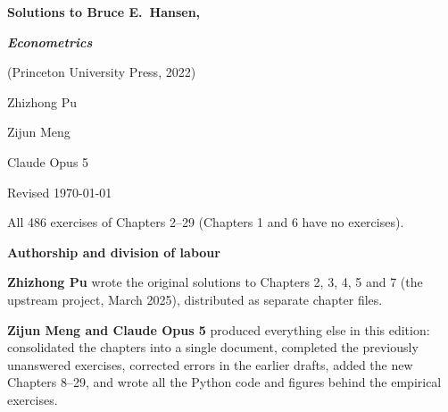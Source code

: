 \documentclass[11pt,letterpaper,reqno]{amsart}
\begin{document}
\begin{titlepage}
\centering
\vspace*{0.22\textheight}
{\LARGE\bfseries Solutions to Bruce E.\ Hansen,\par}
\vspace{1.2ex}
{\LARGE\bfseries\itshape Econometrics\par}
\vspace{1.2ex}
{\large (Princeton University Press, 2022)\par}
\vspace{4em}
{\Large Zhizhong Pu\par}
\vspace{1ex}
{\Large Zijun Meng\par}
\vspace{1ex}
{\Large Claude Opus 5\par}
\vspace{4em}
{\large Revised \today\par}
\vfill
{\small All 486 exercises of Chapters 2--29 (Chapters 1 and 6 have no exercises).\par}
\end{titlepage}

\thispagestyle{plain}
\begin{center}{\large\bfseries Authorship and division of labour\par}\end{center}
\vspace{1ex}
\noindent\textbf{Zhizhong Pu} wrote the original solutions to Chapters 2, 3, 4, 5
and 7 (the upstream project, March 2025), distributed as separate chapter files.

\medskip
\noindent\textbf{Zijun Meng and Claude Opus 5} produced everything else in this
edition: consolidated the chapters into a single document, completed the
previously unanswered exercises, corrected errors in the earlier drafts, added
the new Chapters 8--29, and wrote all the Python code and figures behind the
empirical exercises.

\clearpage
\end{document}
